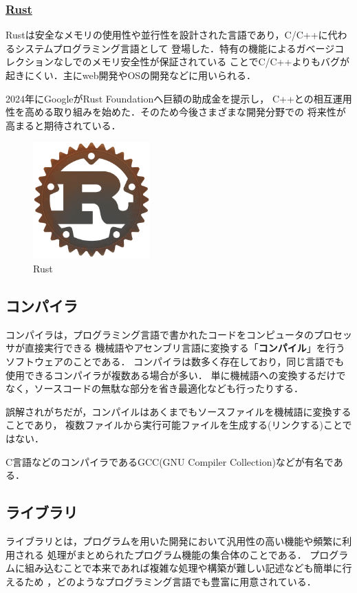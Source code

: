 \documentclass[autodetect-engine,dvi=dvipdfmx,ja=standard,a4j]{bxjsarticle}
\begin{document}
\subsubsection*{\underline{\textbf{Rust}}}
Rustは安全なメモリの使用性や並行性を設計された言語であり，C/C++に代わるシステムプログラミング言語として
登場した．特有の機能によるガベージコレクションなしでのメモリ安全性が保証されている
ことでC/C++よりもバグが起きにくい．主にweb開発やOSの開発などに用いられる．

2024年にGoogleがRust Foundationへ巨額の助成金を提示し，
C++との相互運用性を高める取り組みを始めた．そのため今後さまざまな開発分野での
将来性が高まると期待されている．

\begin{figure}[H]
    \centering
    \includegraphics[width=45mm]{image/Rust.png}
    \caption*{Rust}
    \label{fig:rust}
\end{figure}

\subsection{コンパイラ}
コンパイラは，プログラミング言語で書かれたコードをコンピュータのプロセッサが直接実行できる
機械語やアセンブリ言語に変換する「\textbf{コンパイル}」を行うソフトウェアのことである．
コンパイラは数多く存在しており，同じ言語でも使用できるコンパイラが複数ある場合が多い．
単に機械語への変換するだけでなく，ソースコードの無駄な部分を省き最適化なども行ったりする．

誤解されがちだが，コンパイルはあくまでもソースファイルを機械語に変換することであり，
複数ファイルから実行可能ファイルを生成する(リンクする)ことではない．

C言語などのコンパイラであるGCC(GNU Compiler Collection)などが有名である．

\subsection{ライブラリ}
ライブラリとは，プログラムを用いた開発において汎用性の高い機能や頻繁に利用される
処理がまとめられたプログラム機能の集合体のことである．
プログラムに組み込むことで本来であれば複雑な処理や構築が難しい記述なども簡単に行えるため
，どのようなプログラミング言語でも豊富に用意されている．
\end{document}
